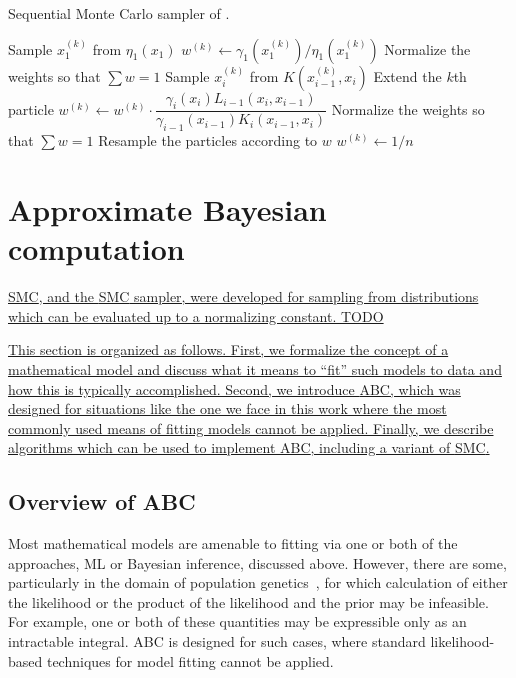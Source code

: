 \begin{algorithm}
  \caption{Sequential Monte Carlo sampler of \textcite{del2006sequential}.}
  \begin{algorithmic}
      \State Sample $x_1^{(k)}$ from $\eta_1(x_1)$
      \State $w^{(k)} \gets \gamma_1(x_1^{(k)}) / \eta_1(x_1^{(k)})$
      \State Normalize the weights so that $\sum w = 1$
    \EndFor
        \State Sample $x_i^{(k)}$ from $K(x_{i-1}^{(k)}, x_i)$
        \Comment Extend the $k$th particle
        \State $w^{(k)} \gets w^{(k)} \cdot \dfrac{\gamma_i(x_i) L_{i-1}(x_i, x_{i-1})}{\gamma_{i-1}(x_{i-1}) K_i(x_{i-1}, x_i)}$
      \EndFor
      \State Normalize the weights so that $\sum w = 1$
        \State Resample the particles according to $w$
          \State $w^{(k)} \gets 1/n$
        \EndFor
      \EndIf
    \EndFor
  \end{algorithmic}
  \label{alg:smcsamp}
\end{algorithm}

\section{Approximate Bayesian computation}
\label{sec:abc}

{\color{blue}\uline{\acrlong{SMC}, and the \gls{SMC} sampler, were developed
for sampling from distributions which can be evaluated up to a normalizing
constant. TODO }

\uline{This section is organized as follows. First, we formalize the concept of a
mathematical model and discuss what it means to ``fit'' such models to data 
and how this is typically accomplished. Second, we introduce \gls{ABC}, which
was designed for situations like the one we face in this work where the most
commonly used means of fitting models cannot be applied. Finally, we describe
algorithms which can be used to implement \gls{ABC}, including a variant of
\gls{SMC}.}}

\subsection{Overview of ABC}
\label{subsec:abcoverview}

Most mathematical models are amenable to fitting via one or both of the
approaches, \gls{ML} or Bayesian inference, discussed above. However, there are
some, particularly in the domain of population
genetics~\autocite{beaumont2002approximate, beaumont2010approximate}, for which
calculation of either the likelihood or the product of the likelihood and the
prior may be infeasible. For example, one or both of these quantities may be
expressible only as an intractable integral. \Gls{ABC} is designed for such
cases, where standard likelihood-based techniques for model fitting cannot be
applied. 

